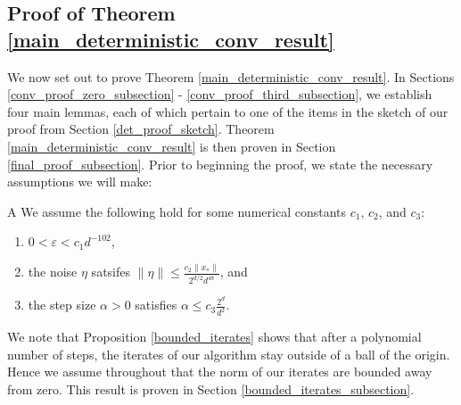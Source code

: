 \documentclass[11pt]{article}
\renewcommand{\epsilon}{\varepsilon}
\newcommand{\al}{\alpha}
\theoremstyle{remark}
\begin{document}



\subsection{Proof of Theorem \ref{main_deterministic_conv_result}} \label{formal_proof_section}

We now set out to prove Theorem \ref{main_deterministic_conv_result}. In Sections \ref{conv_proof_zero_subsection} - \ref{conv_proof_third_subsection}, we establish four main lemmas, each of which pertain to one of the items in the sketch of our proof from Section \ref{det_proof_sketch}. Theorem \ref{main_deterministic_conv_result} is then proven in Section \ref{final_proof_subsection}. Prior to beginning the proof, we state the necessary assumptions we will make: \begin{customasmp}{A} \label{assumptions} We assume the following hold for some numerical constants $c_1$, $c_2$, and $c_3$:
\begin{enumerate}
    \item[\textbf{A1.}] $0 < \epsilon < c_1 d^{-102}$,
    \item[\textbf{A2.}] the noise $\eta$ satsifes $\|\eta\| \leqslant \frac{c_2\|x_*\|}{2^{d/2}d^{48}}$, and
    \item[\textbf{A3.}] the step size $\al > 0$ satisfies $\al \leqslant c_3\frac{2^d}{d^2}$.
\end{enumerate}
\end{customasmp} \noindent We note that Proposition \ref{bounded_iterates} shows that after a polynomial number of steps, the iterates of our algorithm stay outside of a ball of the origin. Hence we assume throughout that the norm of our iterates are bounded away from zero. This result is proven in Section \ref{bounded_iterates_subsection}.
\end{document}
